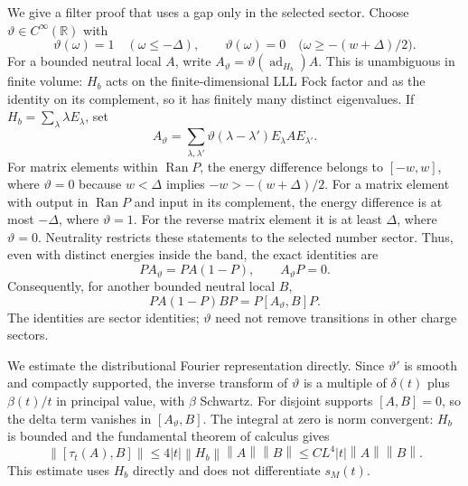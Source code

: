 \documentclass[11pt]{article}
\theoremstyle{definition}
\theoremstyle{remark}
\newcommand{\Ran}{\operatorname{Ran}}
\newcommand{\norm}[1]{\left\lVert#1\right\rVert}
\newcommand{\ad}{\operatorname{ad}}
\begin{document}
We give a filter proof that uses a gap only in the selected
sector.  Choose \(\vartheta\in C^\infty(\mathbb R)\) with
\[
 \vartheta(\omega)=1\quad(\omega\le-\Delta),\qquad
 \vartheta(\omega)=0\quad\bigl(\omega\ge-(w+\Delta)/2\bigr).
\]
For a bounded neutral local \(A\), write
\(A_{\vartheta}=\vartheta(\ad_{H_b})A\).  This is unambiguous in finite volume:
\(H_b\) acts on the finite-dimensional LLL Fock factor and as
the identity on its complement, so it has finitely many distinct
eigenvalues.  If \(H_b=\sum_\lambda\lambda E_\lambda\), set
\[
 A_{\vartheta}=\sum_{\lambda,\lambda'}
 \vartheta(\lambda-\lambda')E_\lambda A E_{\lambda'}.
\]
For matrix elements within \(\Ran P\), the energy difference
belongs to \([-w,w]\), where \(\vartheta=0\) because
\(w<\Delta\) implies \(-w>-(w+\Delta)/2\).
For a matrix element with output in
\(\Ran P\) and input in its complement, the energy difference
is at most \(-\Delta\), where \(\vartheta=1\).  For the
reverse matrix element it is at least \(\Delta\), where
\(\vartheta=0\).  Neutrality restricts these statements to
the selected number sector.  Thus, even with distinct energies
inside the band, the exact identities are
\[
 PA_{\vartheta}=PA(1-P),\qquad A_{\vartheta}P=0.
\]
Consequently, for another bounded neutral local \(B\),
\begin{equation}\label{eq:clusteridentity}
 PA(1-P)BP=P[A_{\vartheta},B]P.
\end{equation}
The identities are sector identities; \(\vartheta\) need not remove
transitions in other charge sectors.

We estimate the distributional Fourier representation directly.
Since \(\vartheta'\) is smooth and compactly supported, the inverse
transform of \(\vartheta\) is a multiple of \(\delta(t)\) plus
\(\beta(t)/t\) in principal value, with \(\beta\) Schwartz.
For disjoint supports \([A,B]=0\), so the delta term vanishes in
\([A_\vartheta,B]\).  The integral at zero is norm convergent:
\(H_b\) is bounded and the fundamental theorem of calculus gives
\begin{equation}\label{eq:smalltime}
 \norm{[\tau_t(A),B]}
 \le4|t|\norm{H_b}\norm A\norm B
 \le CL^4|t|\norm A\norm B.
\end{equation}
This estimate uses \(H_b\) directly and does not differentiate
\(s_M(t)\).
\end{document}
